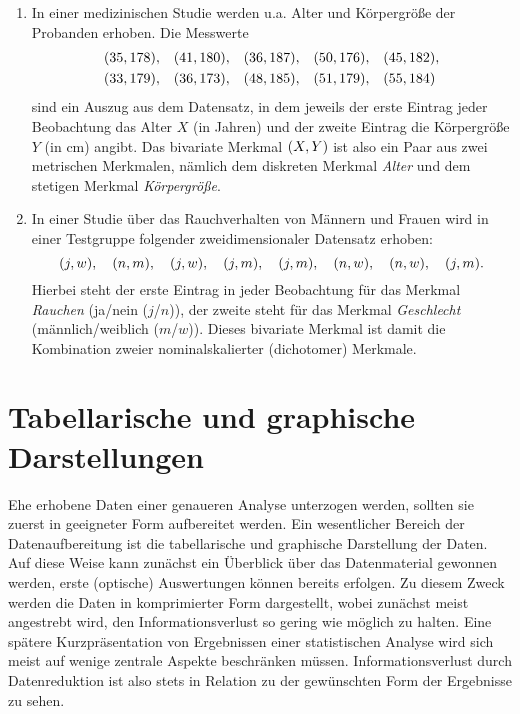 \documentclass{lecture}
\begin{document}
    \begin{example}
        \begin{enumerate}
            \item In einer medizinischen Studie werden u.a. Alter und Körpergröße der Probanden erhoben.
            Die Messwerte
            \begin{align*}
                &\parentheses*{35, 178}, & &\parentheses*{41, 180}, & &\parentheses*{36, 187}, & &\parentheses*{50, 176}, & &\parentheses*{45, 182},\\
                &\parentheses*{33, 179}, & &\parentheses*{36, 173}, & &\parentheses*{48, 185}, & &\parentheses*{51, 179}, & &\parentheses*{55, 184}
            \end{align*}
            sind ein Auszug aus dem Datensatz, in dem jeweils der erste Eintrag jeder Beobachtung das Alter \(X\) (in Jahren) und der zweite Eintrag die Körpergröße \(Y\) (in \si{\centi\meter}) angibt.
            Das bivariate Merkmal \(\parentheses*{X, Y}\) ist also ein Paar aus zwei metrischen Merkmalen, nämlich dem diskreten Merkmal \emph{Alter} und dem stetigen Merkmal \emph{Körpergröße}.
            \item In einer Studie über das Rauchverhalten von Männern und Frauen wird in einer Testgruppe folgender zweidimensionaler Datensatz erhoben:
            \[
                \parentheses*{j, w}, \quad \parentheses*{n, m}, \quad \parentheses*{j, w}, \quad \parentheses*{j, m}, \quad \parentheses*{j, m}, \quad \parentheses*{n, w}, \quad \parentheses*{n, w}, \quad \parentheses*{j, m}.
            \]
            Hierbei steht der erste Eintrag in jeder Beobachtung für das Merkmal \emph{Rauchen} (ja/nein (\(j\)/\(n\))), der zweite steht für das Merkmal \emph{Geschlecht} (männlich/weiblich (\(m\)/\(w\))).
            Dieses bivariate Merkmal ist damit die Kombination zweier nominalskalierter (dichotomer) Merkmale.
        \end{enumerate}
    \end{example}


    \section*{Tabellarische und graphische Darstellungen}

    Ehe erhobene Daten einer genaueren Analyse unterzogen werden, sollten sie zuerst in geeigneter Form aufbereitet werden.
    Ein wesentlicher Bereich der Datenaufbereitung ist die tabellarische und graphische Darstellung der Daten.
    Auf diese Weise kann zunächst ein Überblick über das Datenmaterial gewonnen werden, erste (optische) Auswertungen können bereits erfolgen.
    Zu diesem Zweck werden die Daten in komprimierter Form dargestellt, wobei zunächst meist angestrebt wird, den Informationsverlust so gering wie möglich zu halten.
    Eine spätere Kurzpräsentation von Ergebnissen einer statistischen Analyse wird sich meist auf wenige zentrale Aspekte beschränken müssen.
    Informationsverlust durch Datenreduktion ist also stets in Relation zu der gewünschten Form der Ergebnisse zu sehen.
    
\end{document}
